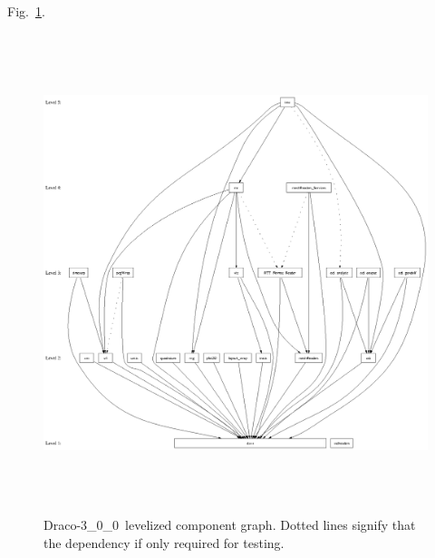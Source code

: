 \documentclass[11pt]{nmemo}
\newcommand{\draco}{Draco}
\newcommand{\dracor}{\draco-3\_0\_0}
\begin{document}
Fig.~\ref{fig:level}.
\begin{figure}
  \label{fig:level}
  \centerline{
    \includegraphics[height=5.5in]{level-3_0_0.ps}}
  \caption{\dracor\ levelized component graph.  Dotted lines signify
    that the dependency if only required for testing.}
\end{figure}
\end{document}
